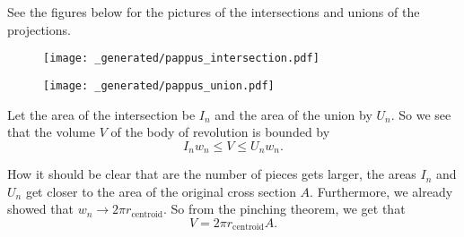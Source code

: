 See the figures below for the pictures of the intersections and unions of the projections.
\begin{figure}[h]
\centering
\texttt{[image: \_generated/pappus\_intersection.pdf]}
\end{figure}

\begin{figure}[h]
\centering
\texttt{[image: \_generated/pappus\_union.pdf]}
\end{figure}

Let the area of the intersection be \(I_n\) and the area of the union by \(U_n\). So we see that
the volume \(V\) of the body of revolution is bounded by
\begin{equation}
I_n w_n \leq V \leq U_n w_n.
\end{equation}

How it should be clear that are the number of pieces gets larger, the areas \(I_n\) and \(U_n\) get
closer to the area of the original cross section \(A\). Furthermore, we already showed that
\(w_n \to 2\pi r_{\text{centroid}}\). So from the pinching theorem, we get that
\begin{equation}
V = 2\pi r_{\text{centroid}} A.
\end{equation} 
